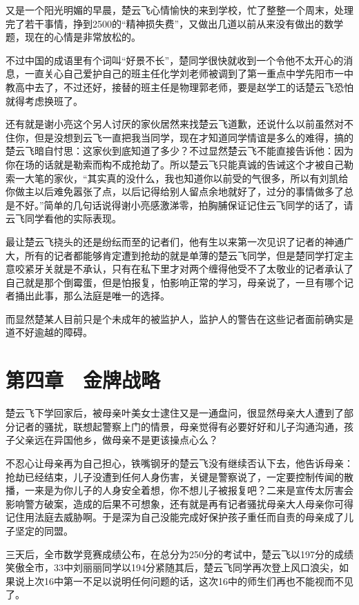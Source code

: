 又是一个阳光明媚的早晨，楚云飞心情愉快的来到学校，忙了整整一个周末，处理完了若干事情，挣到2500的“精神损失费”，又做出几道以前从来没有做出的数学题，现在的心情是非常放松的。

不过中国的成语里有个词叫“好景不长”，楚同学很快就收到一个令他不太开心的消息，一直关心自己爱护自己的班主任化学刘老师被调到了第一重点中学先阳市一中教高中去了，不过还好，接替的班主任是物理郭老师，要是赵学工的话楚云飞恐怕就得考虑换班了。

还有就是谢小亮这个另人讨厌的家伙居然来找楚云飞道歉，还说什么以前虽然对不住你，但是没想到云飞一直把我当同学，现在才知道同学情谊是多么的难得，搞的楚云飞暗自忖思：这家伙到底知道了多少？不过显然楚云飞不能直接告诉他：因为你在场的话就是勒索而构不成抢劫了。所以楚云飞只能真诚的告诫这个才被自己勒索一大笔的家伙，“其实真的没什么，我也知道你以前受的气很多，所以有刘凯给你做主以后难免嚣张了点，以后记得给别人留点余地就好了，过分的事情做多了总是不好。”简单的几句话说得谢小亮感激涕零，拍胸脯保证记住云飞同学的话了，请云飞同学看他的实际表现。

最让楚云飞挠头的还是纷纭而至的记者们，他有生以来第一次见识了记者的神通广大，所有的记者都能够肯定遭到抢劫的就是单薄的楚云飞同学，但是楚同学打定主意咬紧牙关就是不承认，只有在私下里才对两个缠得他受不了太敬业的记者承认了自己就是那个倒霉蛋，但是怕报复，怕影响正常的学习，母亲说了，一旦有哪个记者捅出此事，那么法庭是唯一的选择。

而显然楚某人目前只是个未成年的被监护人，监护人的警告在这些记者面前确实是道不好逾越的障碍。

\section{第四章　金牌战略}

楚云飞下学回家后，被母亲叶美女士逮住又是一通盘问，很显然母亲大人遭到了部分记者的骚扰，联想起警察上门的情景，母亲觉得有必要好好和儿子沟通沟通，孩子父亲远在异国他乡，做母亲不是更该操点心么？

不忍心让母亲再为自己担心，铁嘴钢牙的楚云飞没有继续否认下去，他告诉母亲：抢劫已经结束，儿子没遭到任何人身伤害，关键是警察说了，一定要控制传闻的散播，一来是为你儿子的人身安全着想，你不想儿子被报复吧？二来是宣传太厉害会影响警方破案，造成的后果不可想象，还有就是再有记者骚扰母亲大人母亲你可得记住用法庭去威胁啊。于是深为自己没能完成好保护孩子重任而自责的母亲成了儿子坚定的同盟。

三天后，全市数学竞赛成绩公布，在总分为250分的考试中，楚云飞以197分的成绩笑傲全市，33中刘丽丽同学以194分紧随其后，楚云飞同学再次登上风口浪尖，如果说上次16中第一不足以说明任何问题的话，这次16中的师生们再也不能视而不见了。


